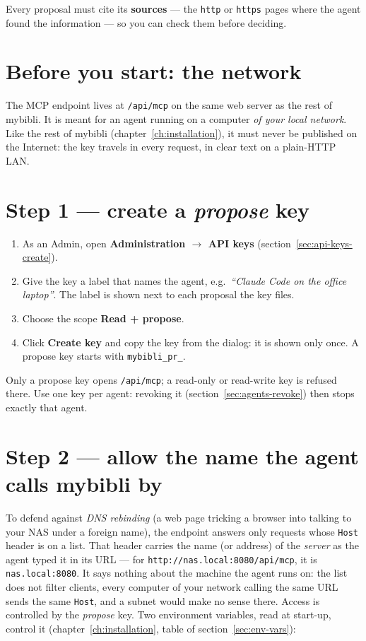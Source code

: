 Every proposal must cite its \textbf{sources} --- the \texttt{http}
or \texttt{https} pages where the agent found the information --- so
you can check them before deciding.

\section{Before you start: the network}
\label{sec:agents-network}

The MCP endpoint lives at \texttt{/api/mcp}
on the same web server as the rest of mybibli. It is meant for an
agent running on a computer \emph{of your local network}. Like the
rest of mybibli (chapter~\ref{ch:installation}), it must never be
published on the Internet: the key travels in every request, in clear
text on a plain-HTTP LAN.

\section{Step 1 --- create a \emph{propose} key}
\label{sec:agents-key}

\begin{enumerate}
  \item As an Admin, open \textbf{Administration \(\rightarrow\) API
        keys} (section~\ref{sec:api-keys-create}).
  \item Give the key a label that names the agent, e.g.\
        \emph{``Claude Code on the office laptop''}. The label is
        shown next to each proposal the key files.
  \item Choose the scope \textbf{Read + propose}.
  \item Click \textbf{Create key} and copy the key from the dialog:
        it is shown only once. A propose key starts with
        \texttt{mybibli\_pr\_}.
\end{enumerate}

Only a propose key opens \texttt{/api/mcp}; a read-only or
read-write key is refused there. Use one key per agent: revoking it
(section~\ref{sec:agents-revoke}) then stops exactly that agent.

\section{Step 2 --- allow the name the agent calls mybibli by}
\label{sec:agents-hosts}

To defend against \emph{DNS rebinding} (a web page tricking a browser
into talking to your NAS under a foreign name), the endpoint answers
only requests whose \texttt{Host} header is on a list. That header
carries the name (or address) of the \emph{server} as the agent typed
it in its URL --- for \texttt{http://nas.local:8080/api/mcp}, it is
\texttt{nas.local:8080}. It says nothing about the machine the agent
runs on: the list does not filter clients, every computer of your
network calling the same URL sends the same \texttt{Host}, and a
subnet would make no sense there. Access is controlled by the
\emph{propose} key. Two environment
variables, read at start-up, control it (chapter~\ref{ch:installation},
table of section~\ref{sec:env-vars}):

